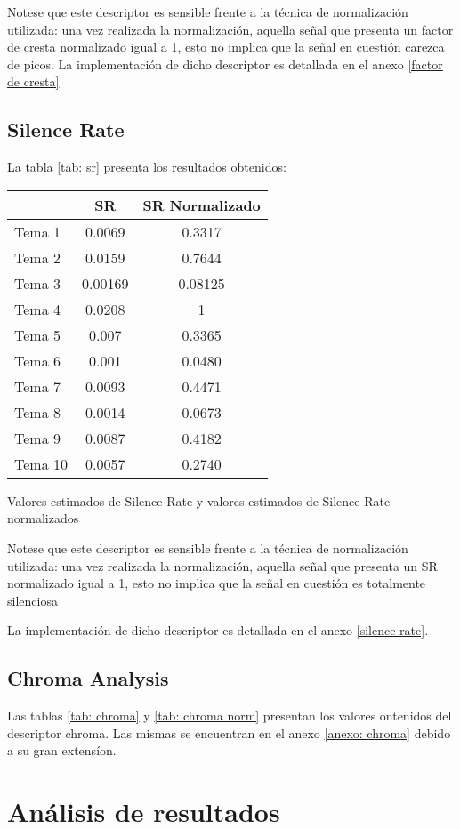\documentclass[]{article}
\makeatletter
\newcommand{\tabla}[4]{
\begin{tablehere}
\begin{center}
\begin{tabular}{#1}
#2
\end{tabular}
\caption{#3}
\label{#4}
\end{center}
\end{tablehere}
}
\newenvironment{tablehere}    %
  {\def\@captype{table}}    %

  {}              %
\makeatother
\begin{document}
\begin{multicols}{2}
Notese que este descriptor es sensible frente a la técnica de normalización
utilizada: una vez realizada la normalización, aquella señal que presenta un factor de cresta
normalizado igual a 1, esto no implica que la señal en cuestión carezca de picos.
\newline
La implementación de dicho descriptor es detallada en el anexo \ref{factor de cresta}

\subsection{Silence Rate}
La tabla \ref{tab: sr} presenta los resultados obtenidos:
\vspace{0.3 cm}
\tabla
{|l|c|c|}
{
\hline
& SR	& SR Normalizado \\
\hline
Tema 1 &	0.0069 &	0.3317 \\
\hline
Tema 2	& 0.0159	& 0.7644 \\
\hline
Tema 3 &	0.00169 &	0.08125 \\
\hline
Tema 4 &	 0.0208	&  1 \\
\hline
Tema 5	&  0.007  &	0.3365 \\
\hline
Tema 6  &	0.001	 & 0.0480 \\
\hline
Tema 7	&  0.0093	 & 0.4471 \\
\hline
Tema 8  &	0.0014  &	0.0673 \\
\hline
Tema 9	&  0.0087 &	0.4182 \\
\hline
Tema 10	&  0.0057 &	0.2740 \\
\hline
}
{Valores estimados de Silence Rate y valores estimados de Silence Rate normalizados}
{tab: sr}

Notese que este descriptor es sensible frente a la técnica de normalización
utilizada: una vez realizada la normalización, aquella señal que presenta un SR
normalizado igual a 1, esto no implica que la señal en cuestión es totalmente silenciosa

La implementación de dicho descriptor es detallada en el anexo \ref{silence rate}.

\subsection{Chroma Analysis}
Las tablas \ref{tab: chroma} y \ref{tab: chroma norm} presentan los valores
ontenidos del descriptor chroma.
Las mismas se encuentran en el anexo \ref{anexo: chroma} debido a su gran
extensíon.

\section{Análisis de resultados}

\end{multicols}
\end{document}

